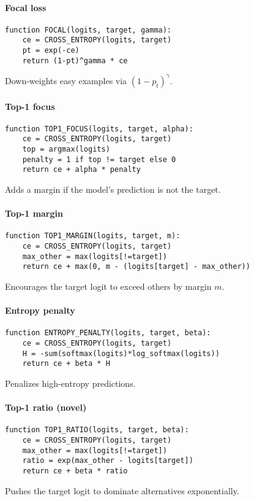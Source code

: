 \documentclass{article}
\begin{document}
\paragraph{Focal loss}
\begin{lstlisting}
function FOCAL(logits, target, gamma):
    ce = CROSS_ENTROPY(logits, target)
    pt = exp(-ce)
    return (1-pt)^gamma * ce
\end{lstlisting}
Down-weights easy examples via $(1-p_t)^\gamma$.

\paragraph{Top-1 focus}
\begin{lstlisting}
function TOP1_FOCUS(logits, target, alpha):
    ce = CROSS_ENTROPY(logits, target)
    top = argmax(logits)
    penalty = 1 if top != target else 0
    return ce + alpha * penalty
\end{lstlisting}
Adds a margin if the model's prediction is not the target.

\paragraph{Top-1 margin}
\begin{lstlisting}
function TOP1_MARGIN(logits, target, m):
    ce = CROSS_ENTROPY(logits, target)
    max_other = max(logits[!=target])
    return ce + max(0, m - (logits[target] - max_other))
\end{lstlisting}
Encourages the target logit to exceed others by margin $m$.

\paragraph{Entropy penalty}
\begin{lstlisting}
function ENTROPY_PENALTY(logits, target, beta):
    ce = CROSS_ENTROPY(logits, target)
    H = -sum(softmax(logits)*log_softmax(logits))
    return ce + beta * H
\end{lstlisting}
Penalizes high-entropy predictions.

\paragraph{Top-1 ratio \textbf{(novel)}}
\begin{lstlisting}
function TOP1_RATIO(logits, target, beta):
    ce = CROSS_ENTROPY(logits, target)
    max_other = max(logits[!=target])
    ratio = exp(max_other - logits[target])
    return ce + beta * ratio
\end{lstlisting}
Pushes the target logit to dominate alternatives exponentially.
\end{document}
